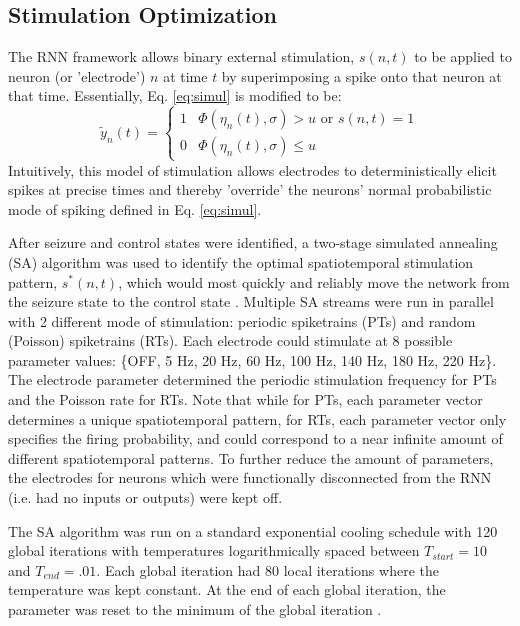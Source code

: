 \documentclass[11pt,a4paper,final]{article}
\begin{document}
\subsection{Stimulation Optimization}
The RNN framework allows binary external stimulation, $s(n,t)$ to be applied to neuron (or 'electrode') $n$ at time $t$ by superimposing a spike onto that neuron at that time.
Essentially, Eq. \ref{eq:simul} is modified to be:
\begin{equation}
\tilde{y}_n(t) =
\begin{cases}
1   & \Phi(\eta_n(t),\sigma) > u \text{ or } s(n,t)=1 \\
0   & \Phi(\eta_n(t),\sigma) \leq u
\end{cases}
\label{eq:stim}
\end{equation}
Intuitively, this model of stimulation allows electrodes to deterministically elicit spikes at precise times and thereby 'override' the neurons' normal probabilistic mode of spiking defined in Eq. \ref{eq:simul}. 

After seizure and control states were identified, a two-stage simulated annealing (SA) algorithm was used to identify the optimal spatiotemporal stimulation pattern, $s^*(n,t)$, which would most quickly and reliably move the network from the seizure state to the control state \citep{kirkpatrick83}.
Multiple SA streams were run in parallel with 2 different mode of stimulation: periodic spiketrains (PTs) and random (Poisson) spiketrains (RTs).
Each electrode could stimulate at 8 possible parameter values: \{OFF, 5 Hz, 20 Hz, 60 Hz, 100 Hz, 140 Hz, 180 Hz, 220 Hz\}.
The electrode parameter determined the periodic stimulation frequency for PTs and the Poisson rate for RTs.
Note that while for PTs, each parameter vector determines a unique spatiotemporal pattern, for RTs, each parameter vector only specifies the firing probability, and could correspond to a near infinite amount of different spatiotemporal patterns.
To further reduce the amount of parameters, the electrodes for neurons which were functionally disconnected from the RNN (i.e. had no inputs or outputs) were kept off.

The SA algorithm was run on a standard exponential cooling schedule with 120 global iterations with temperatures logarithmically spaced between $T_{start}=10$ and $T_{end}=.01$.
Each global iteration had 80 local iterations where the temperature was kept constant.
At the end of each global iteration, the parameter was reset to the minimum of the global iteration \citep{henderson03}.
\end{document}
